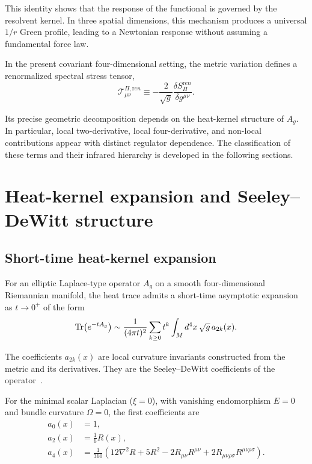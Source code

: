 \documentclass[pdflatex,sn-mathphys-num]{sn-jnl} %
\theoremstyle{remark}
\theoremstyle{plain}
\begin{document}
    This identity shows that the response of the functional is governed by the resolvent kernel.
    In three spatial dimensions, this mechanism produces a universal $1/r$
    Green profile, leading to a Newtonian response without assuming a fundamental force law.

    In the present covariant four-dimensional setting, the metric variation defines a renormalized spectral stress
    tensor,
    \begin{equation}
      \mathcal{T}^{\Pi,{\mathrm ren}}_{\mu\nu}
      \equiv
      -\frac{2}{\sqrt{g}}
      \frac{\delta S_\Pi^{\mathrm ren}}{\delta g^{\mu\nu}} .
    \end{equation}

    Its precise geometric decomposition depends on the heat-kernel structure of $A_g$.
    In particular, local two-derivative, local four-derivative, and non-local contributions appear with distinct
    regulator dependence.
    The classification of these terms and their infrared hierarchy is developed in the following sections.

  \section{Heat-kernel expansion and Seeley--DeWitt structure}
  \label{sec:hk-sdw}

  \subsection{Short-time heat-kernel expansion}
    \label{subsec:hk-expansion}

    For an elliptic Laplace-type operator $A_g$ on a smooth four-dimensional
    Riemannian manifold, the heat trace admits a short-time asymptotic expansion
    as $t \to 0^+$ of the form
    \begin{equation}
      \Tr\!\left(e^{-tA_g}\right)
      \sim
      \frac{1}{(4\pi t)^2}
      \sum_{k\ge 0}
      t^{k}
      \int_M d^4x\,\sqrt{g}\, a_{2k}(x) .
    \end{equation}

    The coefficients $a_{2k}(x)$ are local curvature invariants constructed from
    the metric and its derivatives.
    They are the Seeley--DeWitt coefficients of the operator~\cite{Seeley1967,DeWitt1965,Vassilevich2003}.

    For the minimal scalar Laplacian ($\xi=0$), with vanishing endomorphism
    $E=0$ and bundle curvature $\Omega=0$, the first coefficients are
    \begin{align}
      a_0(x) &= 1 , \\
      a_2(x) &= \frac{1}{6} R(x) , \\
      a_4(x)
      &=
      \frac{1}{360}
      \left(
        12\nabla^2R
        +5R^2
        -2R_{\mu\nu} R^{\mu\nu}
        +2R_{\mu\nu\rho\sigma} R^{\mu\nu\rho\sigma}
      \right) .
    \end{align}
\end{document}
